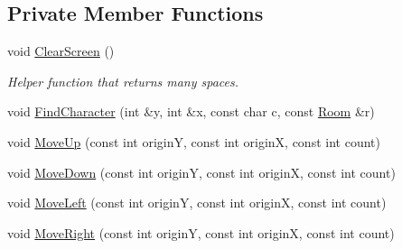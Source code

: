 \subsection*{Private Member Functions}
\begin{DoxyCompactItemize}
\item 
void \hyperlink{classCutscene_af0548c4b14e868b8eb59515121b1c757}{Clear\-Screen} ()
\begin{DoxyCompactList}\small\item\em Helper function that returns many spaces. \end{DoxyCompactList}\item 
void \hyperlink{classCutscene_a38e4c31b0d1e8723aaf577c2f0216bc4}{Find\-Character} (int \&y, int \&x, const char c, const \hyperlink{classRoom}{Room} \&r)
\item 
void \hyperlink{classCutscene_a7ae1d36607d67eeb7b10fb5701973d91}{Move\-Up} (const int origin\-Y, const int origin\-X, const int count)
\item 
void \hyperlink{classCutscene_a364c29bfc80a52b805d1520a84b9edd2}{Move\-Down} (const int origin\-Y, const int origin\-X, const int count)
\item 
void \hyperlink{classCutscene_a8aa2ccd4bece690fa40e97373754ea0f}{Move\-Left} (const int origin\-Y, const int origin\-X, const int count)
\item 
void \hyperlink{classCutscene_a0f9e3e375f124e35337bf48cfb0febc7}{Move\-Right} (const int origin\-Y, const int origin\-X, const int count)
\end{DoxyCompactItemize}
